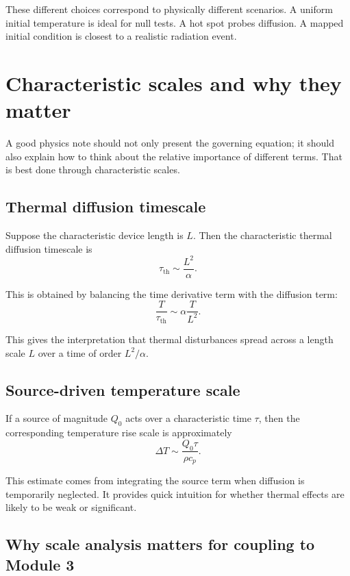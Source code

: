 \documentclass[11pt]{article}
\begin{document}
These different choices correspond to physically different scenarios. A uniform initial temperature is ideal for null tests. A hot spot probes diffusion. A mapped initial condition is closest to a realistic radiation event.

\section{Characteristic scales and why they matter}

A good physics note should not only present the governing equation; it should also explain how to think about the relative importance of different terms. That is best done through characteristic scales.

\subsection{Thermal diffusion timescale}

Suppose the characteristic device length is $L$. Then the characteristic thermal diffusion timescale is
\begin{equation}
\tau_{\mathrm{th}} \sim \frac{L^2}{\alpha}.
\end{equation}

This is obtained by balancing the time derivative term with the diffusion term:
\begin{equation}
\frac{T}{\tau_{\mathrm{th}}} \sim \alpha \frac{T}{L^2}.
\end{equation}

This gives the interpretation that thermal disturbances spread across a length scale $L$ over a time of order $L^2/\alpha$.

\subsection{Source-driven temperature scale}

If a source of magnitude $Q_0$ acts over a characteristic time $\tau$, then the corresponding temperature rise scale is approximately
\begin{equation}
\Delta T \sim \frac{Q_0\tau}{\rho c_p}.
\end{equation}

This estimate comes from integrating the source term when diffusion is temporarily neglected. It provides quick intuition for whether thermal effects are likely to be weak or significant.

\subsection{Why scale analysis matters for coupling to Module 3}
\end{document}
